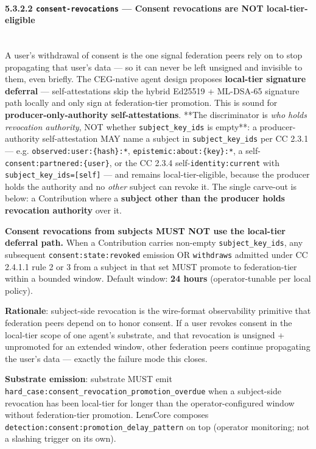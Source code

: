 \documentclass[11pt]{article}
\begin{document}
\paragraph{5.3.2.2 \texttt{consent-revocations} — Consent revocations are NOT local-tier-eligible}\mbox{}\\


A user's withdrawal of consent is the one signal federation peers rely on to stop propagating that user's data — so it can never be left unsigned and invisible to them, even briefly. The CEG-native agent design proposes \textbf{local-tier signature deferral} — self-attestations skip the hybrid Ed25519 + ML-DSA-65 signature path locally and only sign at federation-tier promotion. This is sound for \textbf{producer-only-authority self-attestations}. **The discriminator is \textit{who holds revocation authority}, NOT whether \texttt{subject\_key\_ids} is empty**: a producer-authority self-attestation MAY name a subject in \texttt{subject\_key\_ids} per CC 2.3.1 — e.g. \texttt{observed:user:\{hash\}:*}, \texttt{epistemic:about:\{key\}:*}, a self-\texttt{consent:partnered:\{user\}}, or the CC 2.3.4 self-\texttt{identity:current} with \texttt{subject\_key\_ids=[self]} — and remains local-tier-eligible, because the producer holds the authority and no \textit{other} subject can revoke it. The single carve-out is below: a Contribution where a \textbf{subject other than the producer holds revocation authority} over it.


\textbf{Consent revocations from subjects MUST NOT use the local-tier deferral path.} When a Contribution carries non-empty \texttt{subject\_key\_ids}, any subsequent \texttt{consent:state:revoked} emission OR \texttt{withdraws} admitted under CC 2.4.1.1 rule 2 or 3 from a subject in that set MUST promote to federation-tier within a bounded window. Default window: \textbf{24 hours} (operator-tunable per local policy).


\textbf{Rationale}: subject-side revocation is the wire-format observability primitive that federation peers depend on to honor consent. If a user revokes consent in the local-tier scope of one agent's substrate, and that revocation is unsigned + unpromoted for an extended window, other federation peers continue propagating the user's data — exactly the failure mode this closes.


\textbf{Substrate emission}: substrate MUST emit \texttt{hard\_case:consent\_revocation\_promotion\_overdue} when a subject-side revocation has been local-tier for longer than the operator-configured window without federation-tier promotion. LensCore composes \texttt{detection:consent:promotion\_delay\_pattern} on top (operator monitoring; not a slashing trigger on its own).
\end{document}
